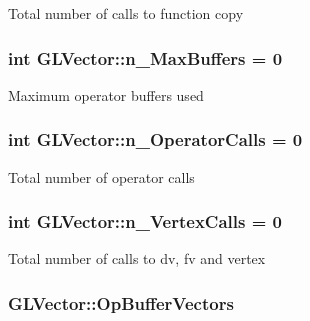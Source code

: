 \label{d4/db1/classGLVector_ad399536bb23ff481180e7eb0a92e9de3}
\-Total number of calls to function copy \hypertarget{classGLVector_a264f756b5ee6a1402deb00ff8bf1d55e}{
\subsubsection[{n\-\_\-\-Max\-Buffers}]{\setlength{\rightskip}{0pt plus 5cm}int {\bf \-G\-L\-Vector\-::n\-\_\-\-Max\-Buffers} = 0}}
\label{d4/db1/classGLVector_a264f756b5ee6a1402deb00ff8bf1d55e}
\-Maximum operator buffers used \hypertarget{classGLVector_a69df2dd2bd7a93ca4530c514f8b70f16}{
\subsubsection[{n\-\_\-\-Operator\-Calls}]{\setlength{\rightskip}{0pt plus 5cm}int {\bf \-G\-L\-Vector\-::n\-\_\-\-Operator\-Calls} = 0}}
\label{d4/db1/classGLVector_a69df2dd2bd7a93ca4530c514f8b70f16}
\-Total number of operator calls \hypertarget{classGLVector_a385e153f287c7b5c5b9fe21dafd81af3}{
\subsubsection[{n\-\_\-\-Vertex\-Calls}]{\setlength{\rightskip}{0pt plus 5cm}int {\bf \-G\-L\-Vector\-::n\-\_\-\-Vertex\-Calls} = 0}}
\label{d4/db1/classGLVector_a385e153f287c7b5c5b9fe21dafd81af3}
\-Total number of calls to dv, fv and vertex \hypertarget{classGLVector_aa4888b5e8b587095f9ea31991a5c072a}{
\subsubsection[{\-Op\-Buffer\-Vectors}]{ {\bf \-G\-L\-Vector\-::\-Op\-Buffer\-Vectors}}}
